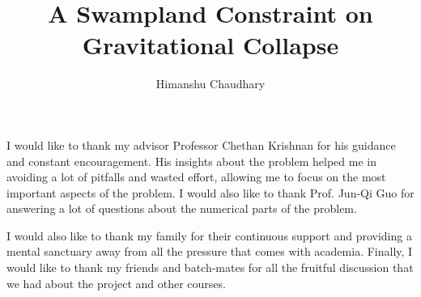 \documentclass[12pt]{caltech_thesis}
\begin{document}
\title{A Swampland Constraint on Gravitational Collapse}
\author{Himanshu Chaudhary}

\address{Bangalore, India}                     %



\maketitle[logo]

\begin{acknowledgements}
   I would like to thank my advisor Professor Chethan Krishnan for his guidance and constant encouragement. His insights about the problem helped me in avoiding a lot of pitfalls and wasted effort, allowing me to focus on the most important aspects of the problem. I would also like to thank Prof. Jun-Qi Guo for answering a lot of questions about the numerical parts of the problem.

   I would also like to thank my family for their continuous support and providing a mental sanctuary away from all the pressure that comes with academia.
   Finally, I would like to thank my friends and batch-mates for all the fruitful discussion that we had about the project and other courses.
\end{acknowledgements}
\end{document}

